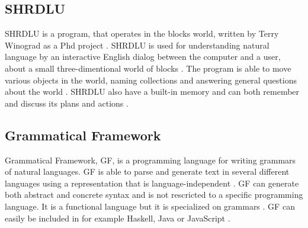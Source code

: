 \subsection{SHRDLU}
SHRDLU is a program, that operates in the blocks world, written by Terry Winograd as a Phd project \citep{SHRDLU_url}. SHRDLU is used for understanding natural language by an interactive English dialog between the computer and a user, about a small three-dimentional world of blocks \citep{SHRDLU_url}. The program is able to move various objects in the world, naming collections and answering general questions about the world \citep{SHRDLU_url2}. SHRDLU also have a built-in memory and can both remember and discuss its plans and actions \citep{SHRDLU_url2}.

\subsection{Grammatical Framework}
Grammatical Framework, GF, is a programming language for writing grammars of natural languages. GF is able to parse and generate text in several different languages using a representation that is language-independent \citep{gf_url}. GF can generate both abstract and concrete syntax and is not rescricted to a specific programming language. It is a functional language but it is specialized on grammars \citep{gf_url}. 
GF can easily be included in for example Haskell, Java or JavaScript \citep{gf_url}.

